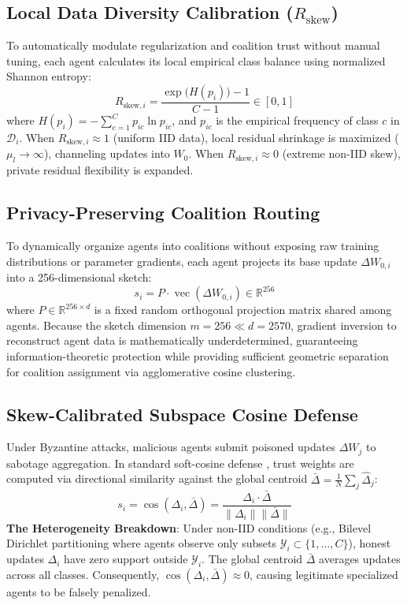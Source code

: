 \documentclass[sigconf]{acmart}
\begin{document}
\subsection{Local Data Diversity Calibration ($R_{\text{skew}}$)}
To automatically modulate regularization and coalition trust without manual tuning, each agent calculates its local empirical class balance using normalized Shannon entropy:
\begin{equation}
\label{eq:r_skew}
R_{\text{skew}, i} = \frac{\exp\big(H(p_i)\big) - 1}{C - 1} \in [0, 1]
\end{equation}
where $H(p_i) = -\sum_{c=1}^C p_{ic} \ln p_{ic}$, and $p_{ic}$ is the empirical frequency of class $c$ in $\mathcal{D}_i$. When $R_{\text{skew}, i} \approx 1$ (uniform IID data), local residual shrinkage is maximized ($\mu_l \to \infty$), channeling updates into $W_0$. When $R_{\text{skew}, i} \approx 0$ (extreme non-IID skew), private residual flexibility is expanded.

\subsection{Privacy-Preserving Coalition Routing}
To dynamically organize agents into coalitions without exposing raw training distributions or parameter gradients, each agent projects its base update $\Delta W_{0, i}$ into a 256-dimensional sketch:
\begin{equation}
s_i = P \cdot \operatorname{vec}(\Delta W_{0, i}) \in \mathbb{R}^{256}
\end{equation}
where $P \in \mathbb{R}^{256 \times d}$ is a fixed random orthogonal projection matrix shared among agents. Because the sketch dimension $m = 256 \ll d = 2570$, gradient inversion to reconstruct agent data is mathematically underdetermined, guaranteeing information-theoretic protection while providing sufficient geometric separation for coalition assignment via agglomerative cosine clustering.

\subsection{Skew-Calibrated Subspace Cosine Defense}
Under Byzantine attacks, malicious agents submit poisoned updates $\Delta W_{j}$ to sabotage aggregation. In standard soft-cosine defense \cite{sun2019can}, trust weights are computed via directional similarity against the global centroid $\bar{\Delta} = \frac{1}{N} \sum_j \hat{\Delta}_j$:
\begin{equation}
s_i = \cos(\Delta_i, \bar{\Delta}) = \frac{\Delta_i \cdot \bar{\Delta}}{\|\Delta_i\| \|\bar{\Delta}\|}
\end{equation}
\textbf{The Heterogeneity Breakdown}: Under non-IID conditions (e.g., Bilevel Dirichlet partitioning where agents observe only subsets $\mathcal{Y}_i \subset \{1, \dots, C\}$), honest updates $\Delta_i$ have zero support outside $\mathcal{Y}_i$. The global centroid $\bar{\Delta}$ averages updates across all classes. Consequently, $\cos(\Delta_i, \bar{\Delta}) \approx 0$, causing legitimate specialized agents to be falsely penalized.
\end{document}
